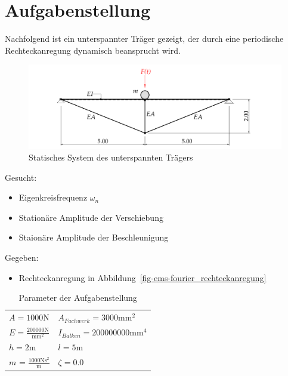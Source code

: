 \documentclass[
  letterpaper,
  DIV=11]{scrreprt}
\providecommand{\tightlist}{%
  \setlength{\itemsep}{0pt}\setlength{\parskip}{0pt}}\usepackage{longtable,booktabs,array}
\begin{document}
\hypertarget{aufgabenstellung-8}{%
\section{Aufgabenstellung}\label{aufgabenstellung-8}}

Nachfolgend ist ein unterspannter Träger gezeigt, der durch eine
periodische Rechteckanregung dynamisch beansprucht wird.

\begin{figure}[H]

{\centering \includegraphics{index_files/mediabag/bilder/aufgabe_ems_fourier_system.pdf}

}

\caption{\label{fig-ems-fourier_system}Statisches System des
unterspannten Trägers}

\end{figure}

Gesucht:

\begin{itemize}
\tightlist
\item
  Eigenkreisfrequenz \(\omega_n\)
\item
  Stationäre Amplitude der Verschiebung
\item
  Staionäre Amplitude der Beschleunigung
\end{itemize}

Gegeben:

\begin{itemize}
\tightlist
\item
  Rechteckanregung in Abbildung~\ref{fig-ems-fourier_rechteckanregung}
\end{itemize}

\hypertarget{tbl-parameter_fourier}{}
\begin{longtable}[]{@{}
  >{\raggedright\arraybackslash}p{}
  >{\raggedright\arraybackslash}p{}@{}}
\caption{\label{tbl-parameter_fourier}Parameter der
Aufgabenstellung}\tabularnewline
\toprule\noalign{}
\endfirsthead
\endhead
\bottomrule\noalign{}
\endlastfoot
\(A = 1000 \text{N}\) & \(A_{Fachwerk} = 3000 \text{mm}^{2}\) \\
\(E = \frac{200000 \text{N}}{\text{mm}^{2}}\) &
\(I_{Balken} = 200000000 \text{mm}^{4}\) \\
\(h = 2 \text{m}\) & \(l = 5 \text{m}\) \\
\(m_{} = \frac{1000 \text{N} \text{s}^{2}}{\text{m}}\) &
\(\zeta = 0.0\) \\
\end{longtable}
\end{document}
